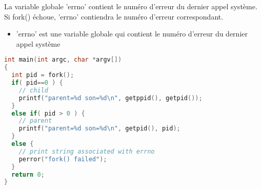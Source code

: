 \documentclass[12pt]{report}
\begin{document}
La variable globale 'errno' contient le numéro d'erreur du dernier appel système. Si fork() échoue, 'errno' contiendra le numéro d'erreur correspondant. 

\begin{itemize} 
\item 'errno' est une variable globale qui contient le numéro d'erreur du dernier appel système 
\end{itemize}
\begin{lstlisting}[language=C] 
int main(int argc, char *argv[]) 
{ 
  int pid = fork(); 
  if( pid==0 ) { 
    // child 
    printf("parent=%d son=%d\n", getppid(), getpid()); 
  } 
  else if( pid > 0 ) { 
    // parent 
    printf("parent=%d son=%d\n", getpid(), pid); 
  } 
  else { 
    // print string associated with errno 
    perror("fork() failed"); 
  } 
  return 0; 
} 
\end{lstlisting}
\end{document}
